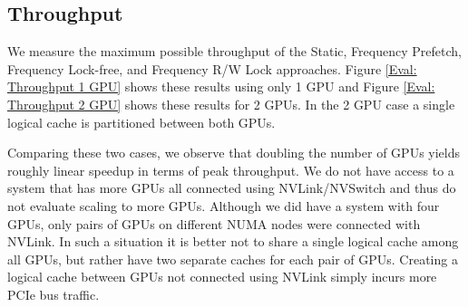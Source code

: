 \subsection{Throughput}
We measure the maximum possible throughput of the Static, Frequency Prefetch, Frequency Lock-free, and Frequency R/W Lock approaches.
Figure \ref{Eval: Throughput 1 GPU} shows these results using only 1 GPU and Figure \ref{Eval: Throughput 2 GPU} shows these results for 2 GPUs. In the 2 GPU case a single logical cache is partitioned between both GPUs.  

Comparing these two cases, we observe that doubling the number of GPUs yields roughly linear speedup in terms of peak throughput. We do not have access to a system that has more GPUs all connected using NVLink/NVSwitch and thus do not evaluate scaling to more GPUs. Although we did have a system with four GPUs, only pairs of GPUs on different NUMA nodes were connected with NVLink. In such a situation it is better not to share a single logical cache among all GPUs, but rather have two separate caches for each pair of GPUs. Creating a logical cache between GPUs not connected using NVLink simply incurs more PCIe bus traffic.
